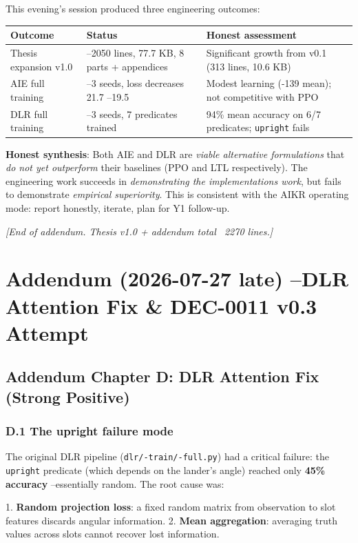 \documentclass[11pt]{article}
\begin{document}
This evening's session produced three engineering outcomes:

\begin{tabular}{lll}
Outcome & Status & Honest assessment \\
\hline
Thesis expansion v1.0 & --2050 lines, 77.7 KB, 8 parts + appendices & Significant growth from v0.1 (313 lines, 10.6 KB) \\
AIE full training & --3 seeds, loss decreases 21.7 --19.5 & Modest learning (-139 mean); not competitive with PPO \\
DLR full training & --3 seeds, 7 predicates trained & 94\% mean accuracy on 6/7 predicates; \texttt{upright} fails \\
\end{tabular}


\textbf{Honest synthesis}: Both AIE and DLR are \textit{viable alternative formulations}
that \textit{do not yet outperform} their baselines (PPO and LTL respectively). The
engineering work succeeds in \textit{demonstrating the implementations work}, but
fails to demonstrate \textit{empirical superiority}. This is consistent with the AIKR
operating mode: report honestly, iterate, plan for Y1 follow-up.

\hrulefill

\textit{[End of addendum. Thesis v1.0 + addendum total ~2270 lines.]}


\hrulefill

\section*{Addendum (2026-07-27 late) --DLR Attention Fix \& DEC-0011 v0.3 Attempt}

\subsection{Addendum Chapter D: DLR Attention Fix (Strong Positive)}

\subsubsection{D.1 The upright failure mode}

The original DLR pipeline (\texttt{dlr/-train/-full.py}) had a critical failure:
the \texttt{upright} predicate (which depends on the lander's angle) reached only
\textbf{45\% accuracy} --essentially random. The root cause was:

1. \textbf{Random projection loss}: a fixed random matrix from observation
   to slot features discards angular information.
2. \textbf{Mean aggregation}: averaging truth values across slots cannot
   recover lost information.
\end{document}
